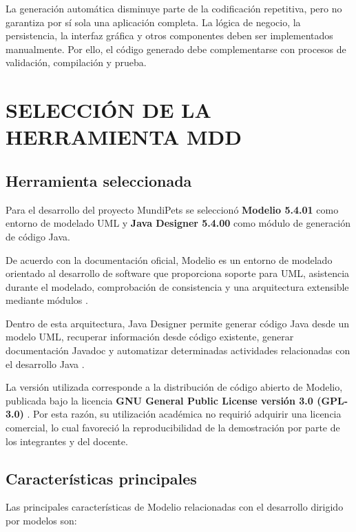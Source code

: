 \documentclass[10pt,a4paper,openany]{report}
\begin{document}
	La generación automática disminuye parte de la codificación repetitiva,
	pero no garantiza por sí sola una aplicación completa. La lógica de
	negocio, la persistencia, la interfaz gráfica y otros componentes deben
	ser implementados manualmente. Por ello, el código generado debe
	complementarse con procesos de validación, compilación y prueba.
	
	
	
	
	\chapter{SELECCIÓN DE LA HERRAMIENTA MDD}
	
	\section{Herramienta seleccionada}
	
	Para el desarrollo del proyecto MundiPets se seleccionó
	\textbf{Modelio 5.4.01} como entorno de modelado UML y
	\textbf{Java Designer 5.4.00} como módulo de generación de código
	Java.
	
	De acuerdo con la documentación oficial, Modelio es un entorno de
	modelado orientado al desarrollo de software que proporciona soporte
	para UML, asistencia durante el modelado, comprobación de consistencia
	y una arquitectura extensible mediante módulos
	\cite{modelioOficial}.
	
	Dentro de esta arquitectura, Java Designer permite generar código Java
	desde un modelo UML, recuperar información desde código existente,
	generar documentación Javadoc y automatizar determinadas actividades
	relacionadas con el desarrollo Java
	\cite{modelioJavaDesigner}.
	
	La versión utilizada corresponde a la distribución de código abierto de
	Modelio, publicada bajo la licencia
	\textbf{GNU General Public License versión 3.0 (GPL-3.0)}
	\cite{modelioLicencia}. Por esta razón, su utilización académica no
	requirió adquirir una licencia comercial, lo cual favoreció la
	reproducibilidad de la demostración por parte de los integrantes y del
	docente.
	
	
	\section{Características principales}
	
	Las principales características de Modelio relacionadas con el desarrollo 
	dirigido por modelos son:
	
\end{document}
